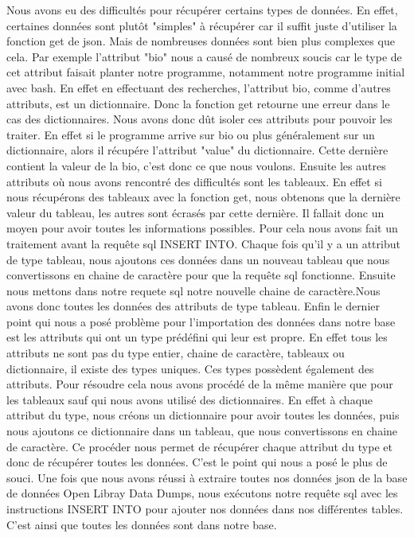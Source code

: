 \documentclass[12pt, a4paper]{article}
\begin{document}
Nous avons eu des difficultés pour récupérer certains types de données. En effet, certaines données sont plutôt "simples" à récupérer car il suffit juste d'utiliser la fonction get de json. Mais de nombreuses données sont bien plus complexes que cela. Par exemple l'attribut "bio" nous a causé de nombreux soucis car le type de cet attribut faisait planter notre programme, notamment notre programme initial avec bash. En effet en effectuant des recherches, l'attribut bio, comme d'autres attributs, est un dictionnaire. Donc la fonction get retourne une erreur dans le cas des dictionnaires. Nous avons donc dût isoler ces attributs pour pouvoir les traiter. En effet si le programme arrive sur bio ou plus généralement sur un dictionnaire, alors il récupére l'attribut "value" du dictionnaire. Cette dernière contient la valeur de la bio, c'est donc ce que nous voulons. Ensuite les autres attributs où nous avons rencontré des difficultés sont les tableaux. En effet si nous récupérons des tableaux avec la fonction get, nous obtenons que la dernière valeur du tableau, les autres sont écrasés par cette dernière. Il fallait donc un moyen pour avoir toutes les informations possibles. Pour cela nous avons fait un traitement avant la requête sql INSERT INTO. Chaque fois qu'il y a un attribut de type tableau, nous ajoutons ces données dans un nouveau tableau que nous convertissons en chaine de caractère pour que la requête sql fonctionne. Ensuite nous mettons dans notre requete sql notre nouvelle chaine de caractère.Nous avons donc toutes les données des attributs de type tableau. Enfin le dernier point qui nous a posé problème pour l'importation des données dans notre base est les attributs qui ont un type prédéfini qui leur est propre. En effet tous les attributs ne sont pas du type entier, chaine de caractère, tableaux ou dictionnaire, il existe des types uniques. Ces types possèdent également des attributs. Pour résoudre cela nous avons procédé de la même manière que pour les tableaux sauf qui nous avons utilisé des dictionnaires. En effet à chaque attribut du type, nous créons un dictionnaire pour avoir toutes les données, puis nous ajoutons ce dictionnaire dans un tableau, que nous convertissons en chaine de caractère. Ce procéder nous permet de récupérer chaque attribut du type et donc de récupérer toutes les données. C'est le point qui nous a posé le plus de souci. Une fois que nous avons réussi à extraire toutes nos données json de la base de données Open Libray Data Dumps, nous exécutons notre requête sql avec les instructions INSERT INTO pour ajouter nos données dans nos différentes tables. C'est ainsi que toutes les données sont dans notre base.
\end{document}
